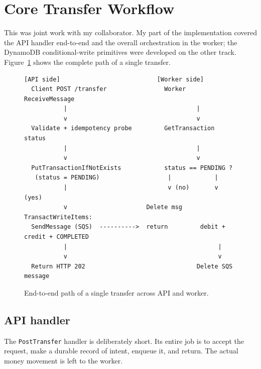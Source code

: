 \documentclass[11pt,a4paper]{article}
\begin{document}
\section{Core Transfer Workflow}

This was joint work with my collaborator. My part of the implementation covered the API handler end-to-end and the overall orchestration in the worker; the DynamoDB conditional-write primitives were developed on the other track. Figure~\ref{fig:flow} shows the complete path of a single transfer.

\begin{figure}[H]
\centering
\begin{lstlisting}[caption={}, label={}, basicstyle=\ttfamily\small, frame=none]
  [API side]                           [Worker side]
  Client POST /transfer                Worker ReceiveMessage
           |                                    |
           v                                    v
  Validate + idempotency probe         GetTransaction status
           |                                    |
           v                                    v
  PutTransactionIfNotExists            status == PENDING ?
   (status = PENDING)                   |            |
           |                            v (no)       v (yes)
           v                      Delete msg     TransactWriteItems:
  SendMessage (SQS)  ---------->  return         debit + credit + COMPLETED
           |                                          |
           v                                          v
  Return HTTP 202                               Delete SQS message
\end{lstlisting}
\caption{End-to-end path of a single transfer across API and worker.}
\label{fig:flow}
\end{figure}

\subsection{API handler}

The \texttt{PostTransfer} handler is deliberately short. Its entire job is to accept the request, make a durable record of intent, enqueue it, and return. The actual money movement is left to the worker.
\end{document}
